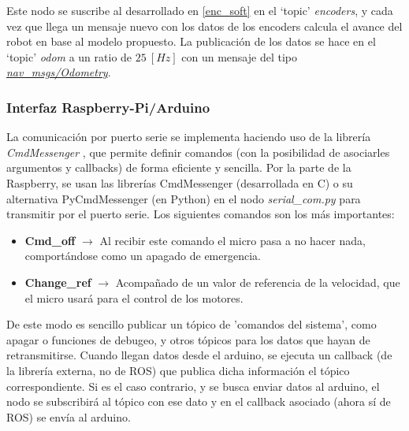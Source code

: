 \par
Este nodo se suscribe al desarrollado en \ref{enc_soft} en el `topic' \textit{encoders}, y cada vez que llega un mensaje nuevo con los datos de los 
encoders calcula el avance del robot en base al modelo propuesto. La publicación de los datos se hace en el `topic' \textit{odom} a un ratio de $25\ [Hz]$ con un mensaje del tipo \textit{\href{http://docs.ros.org/kinetic/api/nav_msgs/html/msg/Odometry.html}{nav\_msgs/Odometry}}.

\subsubsection{Interfaz Raspberry-Pi/Arduino}
La comunicación por puerto serie se implementa haciendo uso de la librería \textit{CmdMessenger} \cite{CmdMessenger}, que permite definir comandos (con la posibilidad de asociarles argumentos y callbacks) de forma eficiente y sencilla.
Por la parte de la Raspberry, se usan las librerías CmdMessenger (desarrollada en C) o su alternativa PyCmdMessenger (en Python) en el nodo \textit{serial\_com.py} para transmitir por el puerto serie. Los siguientes comandos son los más importantes: \\
\begin{itemize}
	\item \textbf{Cmd\_off} $\rightarrow$ Al recibir este comando el micro pasa a no hacer nada, comportándose como un apagado de emergencia.
	\item \textbf{Change\_ref} $\rightarrow$ Acompañado de un valor de referencia de la velocidad, que el micro usará para el control de los motores.
\end{itemize}
\par
De este modo es sencillo publicar un tópico de 'comandos del sistema', como apagar o funciones de debugeo, y otros tópicos para los datos que hayan de retransmitirse. Cuando llegan datos desde el arduino, se ejecuta un callback (de la librería externa, no de ROS) que publica dicha información el tópico correspondiente. Si es el caso contrario, y se busca enviar datos al arduino, el nodo se subscribirá al tópico con ese dato y en el callback asociado (ahora sí de ROS) se envía al arduino.

